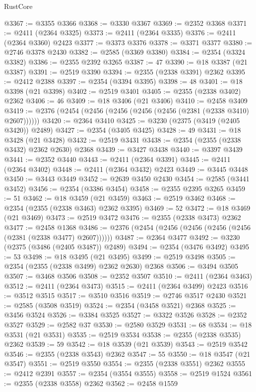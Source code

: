 \begin{lexlean}{RustCore}
\begin{coremodule}
@3367 := @3355 @3366
@3368 := @3330 @3367
@3369 := @2352 @3368
@3371 := @2411 (@2364 @3325)
@3373 := @2411 (@2364 @3335)
@3376 := @2411 (@2364 @3360) @2423
@3377 := @3373 @3376
@3378 := @3371 @3377
@3380 := @2746 @3378 @2430
@3382 := @2585 (@3369 @3380)
@3384 := @2354 (@3324 @3382)
@3386 := @2355 @2392 @3265
@3387 := 47
@3390 := @18 @3387 (@21 @3387)
@3391 := @2519 @3390
@3394 := @2355 (@2338 @3391) @2362
@3395 := @2412 @2388
@3397 := @2354 (@3394 @3395)
@3398 := 48
@3401 := @18 @3398 (@21 @3398)
@3402 := @2519 @3401
@3405 := @2355 (@2338 @3402) @2362
@3406 := 46
@3409 := @18 @3406 (@21 @3406)
@3410 := @2458 @3409
@3419 := @2376 (@2454 (@2456 (@2456 (@2456 (@2456 (@2381 (@2338 @3410) @2607))))))
@3420 := @2364 @3410
@3425 := @3230 (@2375 (@3419 (@2405 @3420)) @2489)
@3427 := @2354 (@3405 @3425)
@3428 := 49
@3431 := @18 @3428 (@21 @3428)
@3432 := @2519 @3431
@3438 := @2354 (@2355 (@2338 @3432) @2362 @2630) @2368
@3439 := @3427 @3438
@3440 := @3397 @3439
@3441 := @2352 @3440
@3443 := @2411 (@2364 @3391)
@3445 := @2411 (@2364 @3402)
@3448 := @2411 (@2364 @3432) @2423
@3449 := @3445 @3448
@3450 := @3443 @3449
@3452 := @2639 @3450 @2430
@3454 := @2585 (@3441 @3452)
@3456 := @2354 (@3386 @3454)
@3458 := @2355 @2395 @3265
@3459 := 51
@3462 := @18 @3459 (@21 @3459)
@3463 := @2519 @3462
@3468 := @2354 (@2355 (@2338 @3463) @2362 @3395)
@3469 := 52
@3472 := @18 @3469 (@21 @3469)
@3473 := @2519 @3472
@3476 := @2355 (@2338 @3473) @2362
@3477 := @2458 @1368
@3486 := @2376 (@2454 (@2456 (@2456 (@2456 (@2456 (@2381 (@2338 @3477) @2607))))))
@3487 := @2364 @3477
@3492 := @3230 (@2375 (@3486 (@2405 @3487)) @2489)
@3494 := @2354 (@3476 @3492)
@3495 := 53
@3498 := @18 @3495 (@21 @3495)
@3499 := @2519 @3498
@3505 := @2354 (@2355 (@2338 @3499) @2362 @2630) @2368
@3506 := @3494 @3505
@3507 := @3468 @3506
@3508 := @2352 @3507
@3510 := @2411 (@2364 @3463)
@3512 := @2411 (@2364 @3473)
@3515 := @2411 (@2364 @3499) @2423
@3516 := @3512 @3515
@3517 := @3510 @3516
@3519 := @2746 @3517 @2430
@3521 := @2585 (@3508 @3519)
@3524 := @2354 (@3458 @3521) @2368
@3525 := @3456 @3524
@3526 := @3384 @3525
@3527 := @3322 @3526
@3528 := @2352 @3527
@3529 := @2582 @37
@3530 := @2580 @3529
@3531 := 68
@3534 := @18 @3531 (@21 @3531)
@3535 := @2519 @3534
@3538 := @2355 (@2338 @3535) @2362
@3539 := 59
@3542 := @18 @3539 (@21 @3539)
@3543 := @2519 @3542
@3546 := @2355 (@2338 @3543) @2362
@3547 := 55
@3550 := @18 @3547 (@21 @3547)
@3551 := @2519 @3550
@3554 := @2355 (@2338 @3551) @2362
@3555 := @2412 @2391
@3557 := @2354 (@3554 @3555)
@3558 := @2519 @1524
@3561 := @2355 (@2338 @3558) @2362
@3562 := @2458 @1559

\end{coremodule}
\end{lexlean}
